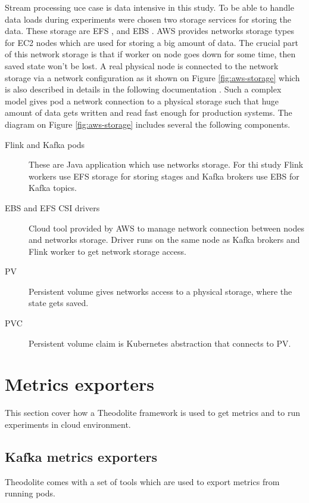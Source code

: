 Stream processing uce case is data intensive in this study.
To be able to handle data loads during experiments were chosen two storage services
for storing the data.
These storage are EFS \cite{awsEFS}, and EBS \cite{awsEBS}.
AWS provides networks storage types for EC2 nodes \cite{EC2} which are used
for storing a big amount of data.
The crucial part of this network storage is that if worker on node goes down for some time,
then saved state won't be lost.
A real physical node is connected to the network storage via a network configuration as it shown on Figure \ref{fig:aws-storage}
which is also described in details in the following documentation \cite{awsKubernetesStorage}.
Such a complex model gives pod a network connection to a physical storage such that huge amount
of data gets written and read fast enough for production systems.
The diagram on Figure \ref{fig:aws-storage} includes several the following components.

\begin{description}
    \item[Flink and Kafka pods] These are Java application which use networks storage.
    For thi study Flink workers use EFS storage for storing stages and Kafka brokers
    use EBS for Kafka topics.
    \item[EBS and EFS CSI drivers] Cloud tool provided by AWS to manage network connection
    between nodes and networks storage.
    Driver runs on the same node as Kafka brokers and Flink worker to get network storage access.
    \item[PV] Persistent volume gives networks access to a physical storage, where the state gets saved.
    \item[PVC] Persistent volume claim is Kubernetes abstraction that connects to PV.
\end{description}


\section{Metrics exporters}\label{sec:metrics-exporters}
This section cover how a Theodolite framework \cite{theodolite_framework} is used
to get metrics and to run experiments in cloud environment.

\subsection{Kafka metrics exporters}\label{subsec:metrics-exporters}
Theodolite comes with a set of tools which are used to export metrics from running pods.


